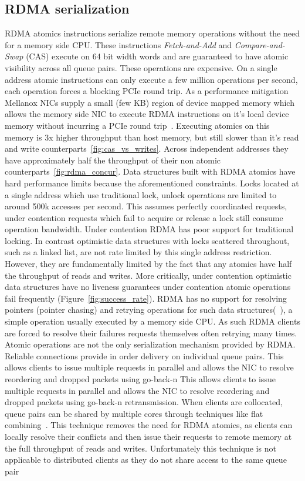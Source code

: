 \subsection{RDMA serialization} RDMA atomics instructions
serialize remote memory operations without the need for a
memory side CPU. These instructions \textit{Fetch-and-Add}
and \textit{Compare-and-Swap} (CAS) execute on 64 bit width
words and are guaranteed to have atomic visibility across
all queue pairs. These operations are expensive. On a single
address atomic instructions can only execute a few million
operations per second, each operation forces a blocking PCIe
round trip.  As a performance mitigation Mellanox NICs
supply a small (few KB) region of device mapped memory which
allows the memory side NIC to execute RDMA instructions on
it's local device memory without incurring a PCIe round
trip~\cite{sherman}. Executing atomics on this memory is 3x higher
throughput than host memory, but still slower than it's read
and write counterparts~\ref{fig:cas_vs_writes}.  Across
independent addresses they have approximately half the
throughput of their non atomic
counterparts~\ref{fig:rdma_concur}. 
Data structures built with RDMA atomics have hard
performance limits because the aforementioned constraints.
Locks located at a single address which use traditional
lock, unlock operations are limited to around 500k accesses
per second. This assumes perfectly coordinated requests,
under contention requests which fail to acquire or release a
lock still consume operation bandwidth.
Under contention RDMA has poor support for traditional
locking. In contrast optimistic data structures with locks
scattered throughout, such as a linked list, are not rate
limited by this single address restriction.  However, they
are fundamentally limited by the fact that any atomics have
half the throughput of reads and writes. More critically,
under contention optimistic data structures have no liveness
guarantees under contention atomic operations fail
frequently (Figure~\ref{fig:success_rate}).  RDMA has no
support for resolving pointers (pointer chasing) and
retrying operations for such data structures(~\cite{rma}), a
simple operation usually executed by a memory side CPU. As
such RDMA clients are forced to resolve their failures
requests themselves often retrying many times.
Atomic operations are not the only serialization mechanism
provided by RDMA. Reliable connections provide in order
delivery on individual queue pairs. This allows clients to
issue multiple requests in parallel and allows the NIC to
resolve reordering and dropped packets using go-back-n This
allows clients to issue multiple requests in parallel and
allows the NIC to resolve reordering and dropped packets
using go-back-n retransmission. When clients are collocated,
queue pairs can be shared by multiple cores through
techniques like flat combining~\cite{flock,sherman}. This
technique removes the need for RDMA atomics, as clients can
locally resolve their conflicts and then issue their
requests to remote memory at the full throughput of reads
and writes. Unfortunately this technique is not applicable
to distributed clients as they do not share access to the
same queue pair

